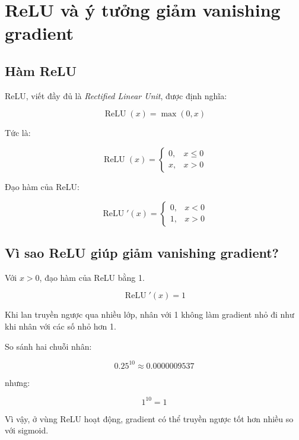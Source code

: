 \documentclass[12pt,a4paper]{report}
\begin{document}
\chapter{ReLU và ý tưởng giảm vanishing gradient}

\section{Hàm ReLU}

ReLU, viết đầy đủ là \textit{Rectified Linear Unit}, được định nghĩa:

\[
    \operatorname{ReLU}(x)=\max(0,x)
\]

Tức là:

\[
    \operatorname{ReLU}(x)=
    \begin{cases}
    0, & x\leq 0\\
    x, & x>0
    \end{cases}
\]

Đạo hàm của ReLU:

\[
    \operatorname{ReLU}'(x)=
    \begin{cases}
    0, & x<0\\
    1, & x>0
    \end{cases}
\]

\begin{center}
\end{center}

\section{Vì sao ReLU giúp giảm vanishing gradient?}

Với $x>0$, đạo hàm của ReLU bằng 1.

\[
    \operatorname{ReLU}'(x)=1
\]

Khi lan truyền ngược qua nhiều lớp, nhân với 1 không làm gradient nhỏ đi như khi nhân với các số nhỏ hơn 1.

\begin{vidu}
So sánh hai chuỗi nhân:

\[
    0.25^{10}\approx 0.0000009537
\]

nhưng:

\[
    1^{10}=1
\]

Vì vậy, ở vùng ReLU hoạt động, gradient có thể truyền ngược tốt hơn nhiều so với sigmoid.
\end{vidu}
\end{document}

